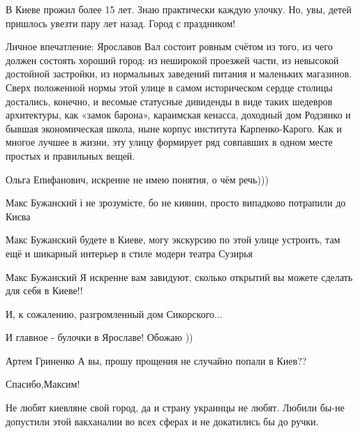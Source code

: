 \begin{itemize}


В Киеве прожил более 15 лет. Знаю практически каждую улочку. Но, увы, детей
пришлось увезти пару лет назад.  Город с праздником!


Личное впечатление: Ярославов Вал состоит ровным счётом из того, из чего должен
состоять хороший город: из неширокой проезжей части, из невысокой достойной
застройки, из нормальных заведений питания и маленьких магазинов. Сверх
положенной нормы этой улице в самом историческом сердце столицы достались,
конечно, и весомые статусные дивиденды в виде таких шедевров архитектуры, как
«замок барона», караимская кенасса, доходный дом Родзянко и бывшая
экономическая школа, ныне корпус института Карпенко-Карого. Как и многое лучшее
в жизни, эту улицу формирует ряд совпавших в одном месте простых и правильных
вещей.


Ольга Епифанович, искренне не имею понятия, о чём речь)))


Макс Бужанский і не зрозумієте, бо не киянин, просто випадково потрапили до
Києва


Макс Бужанский будете в Киеве, могу экскурсию по этой улице устроить, там ещё и
шикарный интерьер в стиле модерн театра Сузирья


Макс Бужанский Я искренне вам завидуют, сколько открытий вы можете сделать для себя в Киеве!!


И, к сожалению, разгромленный дом Сикорского...


И главное - булочки в Ярославе! Обожаю ))


Артем Гриненко А вы, прошу прощения не случайно попали в Киев??


Спасибо,Максим!


Не любят киевляне свой город, да и страну украинцы не любят. Любили бы-не
допустили этой вакханалии во всех сферах и не докатились бы до ручки.


\end{itemize}
